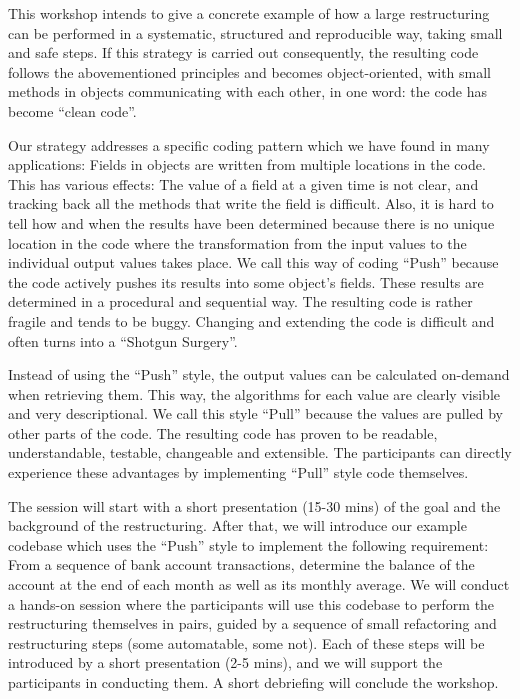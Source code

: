 \documentclass[a4,11pt]{article}
\begin{document}
This workshop intends to give a concrete example of how a large restructuring can be performed in a systematic, structured and reproducible way, taking small and safe steps. If this strategy is carried out consequently, the resulting code follows the abovementioned principles and becomes object-oriented, with small methods in objects communicating with each other, in one word: the code has become ``clean code''.

Our strategy addresses a specific coding pattern which we have found in many applications:
Fields in objects are written from multiple locations in the code. This has various effects: The value of a field at a given time is not clear, and tracking back all the methods that write the field is difficult. Also, it is hard to tell how and when the results have been determined
because there is no unique location in the code where the transformation from the input values to the individual output values takes place.
We call this way of coding ``Push'' because the code actively pushes its results into some object's fields.
These results are determined in a procedural and sequential way. The resulting code is rather fragile and tends to be buggy. Changing and extending the code is difficult and often turns into a ``Shotgun Surgery''.

Instead of using the ``Push'' style, the output values can be calculated on-demand when retrieving them. This way, the algorithms for each value are clearly visible and very descriptional. We call this style ``Pull'' because the values are pulled by other parts of the code. 
The resulting code has proven to be readable, understandable, testable, changeable and extensible.
The participants can directly experience these advantages by implementing ``Pull'' style code themselves. 

The session will start with a short presentation (15-30 mins) of the goal and the background of the restructuring.  
After that, we will introduce our example codebase which uses the ``Push'' style to implement the following requirement:
From a sequence of bank account transactions, determine the balance of the account at the end of each month as well as its monthly average.
We will conduct a hands-on session where the participants will use this codebase to perform the restructuring themselves in pairs, guided by a sequence of small refactoring and restructuring steps (some automatable, some not). Each of these steps will be introduced by a short presentation (2-5 mins), and we will support the participants in conducting them.
A short debriefing will conclude the workshop.
\end{document}
